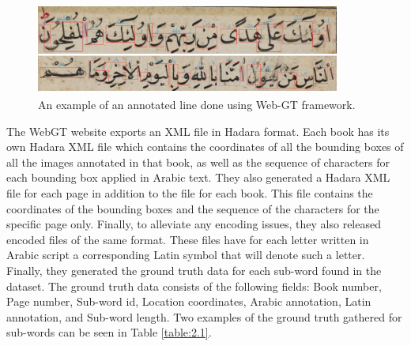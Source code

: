 \begin{figure}[!htb]
    \centering
    \includegraphics[width=10cm, height=3cm]{images/Web-GT.png}
    \caption{An example of an annotated line done using Web-GT framework.}
    \label{fig:Web-GT.png}
\end{figure}

The WebGT website exports an XML file in Hadara\cite{pantke2013hadara} format. Each book has its own Hadara XML file which contains the coordinates of all the bounding boxes of all the images annotated in that book, as well as the sequence of characters for each bounding box applied in Arabic text. They also generated a Hadara XML file for each page in addition to the file for each book. This file contains the coordinates of the bounding boxes and the sequence of the characters for the specific page only. Finally, to alleviate any encoding issues, they also released encoded files of the same format. These files have for each letter written in Arabic script a corresponding Latin symbol that will denote such a letter. \\

Finally, they generated the ground truth data for each sub-word found in the dataset. The ground truth data consists of the following fields: Book number, Page number, Sub-word id, Location coordinates, Arabic annotation, Latin annotation, and Sub-word length. Two examples of the ground truth gathered for sub-words can be seen in Table \ref{table:2.1}.

